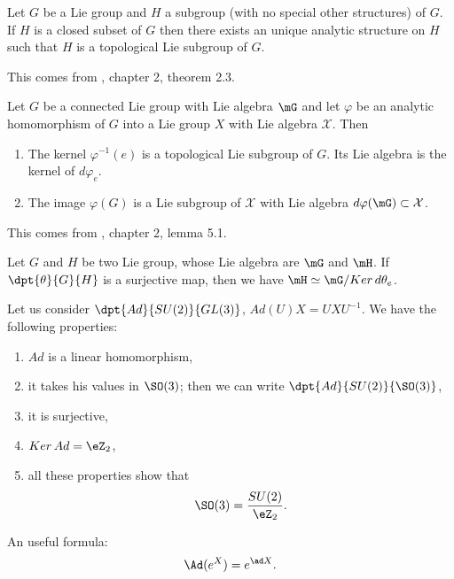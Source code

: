\begin{theorem}
Let $G$ be a Lie group and $H$ a subgroup (with no special other structures) of $G$. If $H$ is a closed subset of $G$ then there exists an unique analytic structure on $H$ such that $H$ is a topological Lie subgroup of $G$.
\label{Helgason2.3}
\end{theorem}
This comes from \cite{Helgason}, chapter 2, theorem 2.3.

\begin{lemma}
Let $G$ be a connected Lie group with Lie algebra $\mG$ and let $\varphi$ be an analytic homomorphism of $G$ into a Lie group $X$ with Lie algebra $\mathcal{X}$. Then

\begin{enumerate}
\item The kernel $\varphi^{-1}(e)$ is a topological Lie subgroup of $G$. Its Lie algebra is the kernel of $d\varphi_e$.
\item The image $\varphi(G)$ is a Lie subgroup of $\mathcal{X}$ with Lie algebra $d\varphi(\mG)\subset\mathcal{X}$.
\end{enumerate}
\label{Helgason5.1}
\end{lemma}
This comes from \cite{Helgason}, chapter 2, lemma 5.1.

\begin{lemma}
Let $G$ and $H$ be two Lie group, whose Lie algebra are $\mG$ and $\mH$. If $\dpt{\theta}{G}{H}$ is a surjective map, then we have $\mH\simeq\mG/Ker\,d\theta_e$.
\label{1203r1}
\end{lemma}

\begin{theorem}
Let us consider $\dpt{Ad}{SU(2)}{GL(3)}$, $Ad(U)X=UXU^{-1}$. We have the following properties:

\begin{enumerate}
\item $Ad$ is a linear homomorphism,
\item it takes his values in $\SO(3)$; then we can write $\dpt{Ad}{SU(2)}{\SO(3)}$,
\item it is surjective,
\item $Ker\,Ad=\eZ_2$,
\item all these properties show that \[\SO(3)=\frac{SU(2)}{\eZ_2}.\]
\end{enumerate}
\label{1503t1}
\end{theorem}


 \begin{corollary}\label{Ad_e}
An useful formula:
\[
   \Ad(e^X)=e^{\ad X}.
\]
\end{corollary}

